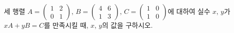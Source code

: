 세 행렬 $A=\begin{pmatrix} 1 & 2 \\ 0 & 1 \end{pmatrix}$, $B=\begin{pmatrix} 4 & 6 \\ 1 & 3 \end{pmatrix}$, $C=\begin{pmatrix} 1 & 0 \\ 1 & 0 \end{pmatrix}$에 대하여 실수 $x$, $y$가 $xA+yB=C$를 만족시킬 때, $x$, $y$의 값을 구하시오.
